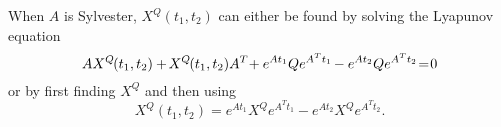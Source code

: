 \documentclass[twocolumn]{autart}
\begin{document}
\begin{thm}\label{th:FiniteIntegralToLyapunov}
When $A$ is Sylvester, $X^Q(t_1,t_2)$ can either be found by solving the Lyapunov equation
\begin{equation}
A X^Q\hspace{-1pt}(t_1,t_2) +\hspace{-1pt} X^Q\hspace{-1pt}(t_1,t_2) A^T \hspace{-2pt}+ e^{A t_1} Q e^{A^T t_1} \hspace{-1pt}- e^{A t_2} Q e^{A^T t_2} \hspace{-2pt}=\hspace{-2pt} 0\label{eq:FiniteTimeLyapunovEquation}
\end{equation}
or by first finding $X^Q$ and then using
\begin{equation}
X^Q(t_1,t_2) = e^{A t_1} X^Q e^{A^T t_1} - e^{A t_2} X^Q e^{A^T t_2}.\label{eq:FiniteTimeLyapunovEquationPartTwo}
\end{equation}
\end{thm}
\end{document}

